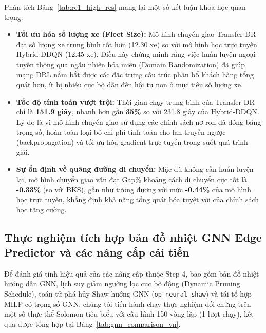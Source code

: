 \documentclass[13pt,a4paper]{extarticle}
\begin{document}
Phân tích Bảng~\ref{tab:rc1_high_res} mang lại một số kết luận khoa học quan trọng:
\begin{itemize}[leftmargin=1.2cm]
  \item \textbf{Tối ưu hóa số lượng xe (Fleet Size):} Mô hình chuyển giao Transfer-DR đạt số lượng xe trung bình tốt hơn (12.30 xe) so với mô hình học trực tuyến Hybrid-DDQN (12.45 xe). Điều này chứng minh rằng việc huấn luyện ngoại tuyến thông qua ngẫu nhiên hóa miền (Domain Randomization) đã giúp mạng DRL nắm bắt được các đặc trưng cấu trúc phân bổ khách hàng tổng quát hơn, ít bị nhiễu cục bộ dẫn đến hội tụ non ở mục tiêu số lượng xe.
  \item \textbf{Tốc độ tính toán vượt trội:} Thời gian chạy trung bình của Transfer-DR chỉ là \textbf{151.9 giây}, nhanh hơn gần \textbf{35\%} so với 231.8 giây của Hybrid-DDQN. Lý do là vì mô hình chuyển giao sử dụng các chính sách nơ-ron đã đóng băng trọng số, hoàn toàn loại bỏ chi phí tính toán cho lan truyền ngược (backpropagation) và tối ưu hóa gradient trực tuyến trong suốt quá trình giải.
  \item \textbf{Sự ổn định về quãng đường di chuyển:} Mặc dù không cần huấn luyện lại, mô hình chuyển giao vẫn đạt Gap\% khoảng cách di chuyển cực tốt là \textbf{-0.33\%} (so với BKS), gần như tương đương với mức \textbf{-0.44\%} của mô hình học trực tuyến, khẳng định khả năng tổng quát hóa tuyệt vời của chính sách học tăng cường.
\end{itemize}

\subsection{Thực nghiệm tích hợp bản đồ nhiệt GNN Edge Predictor và các nâng cấp cải tiến}
\label{subsec:gnn_empirical}

Để đánh giá tính hiệu quả của các nâng cấp thuộc Step 4, bao gồm bản đồ nhiệt hướng dẫn GNN, lịch suy giảm ngưỡng lọc cục bộ động (Dynamic Pruning Schedule), toán tử phá hủy Shaw hướng GNN (\texttt{op\_neural\_shaw}) và tái tổ hợp MILP có trọng số GNN, chúng tôi tiến hành chạy thực nghiệm đối chứng trên một số thực thể Solomon tiêu biểu với cấu hình 150 vòng lặp (1 lượt chạy), kết quả được tổng hợp tại Bảng~\ref{tab:gnn_comparison_vn}.
\end{document}
